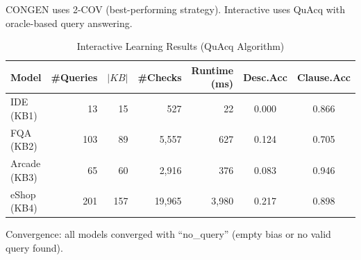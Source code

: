 \documentclass[11pt]{article}
\begin{document}
\begin{table}[htbp]
\centering
\caption{Comparison of CONGEN (Passive) vs Interactive Learning (Active)}
\label{tab:table12_comparison}
\begin{flushleft}
\small CONGEN uses 2-COV (best-performing strategy). Interactive uses QuAcq with oracle-based query answering.
\end{flushleft}
\end{table}

\begin{table}[htbp]
\centering
\caption{Interactive Learning Results (QuAcq Algorithm)}
\label{tab:interactive}
\begin{tabular}{l|rrrr|cc}
\toprule
\textbf{Model} & \textbf{\#Queries} & \textbf{$|KB|$} & \textbf{\#Checks} & \textbf{Runtime (ms)}
    & \textbf{Desc.Acc} & \textbf{Clause.Acc} \\
\midrule
IDE (KB1)    & 13  & 15  & 527    & 22     & 0.000 & 0.866 \\
FQA (KB2)    & 103 & 89  & 5,557  & 627    & 0.124 & 0.705 \\
Arcade (KB3) & 65  & 60  & 2,916  & 376    & 0.083 & 0.946 \\
eShop (KB4)  & 201 & 157 & 19,965 & 3,980  & 0.217 & 0.898 \\
\bottomrule
\end{tabular}
\begin{flushleft}
\small Convergence: all models converged with ``no\_query'' (empty bias or no valid query found).
\end{flushleft}
\end{table}
\end{document}
